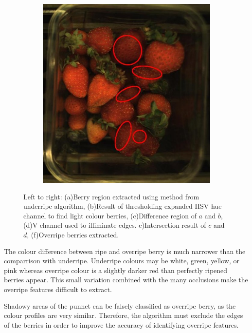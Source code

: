 \documentclass[fleqn,twoside]{article}
\begin{document}
\begin{figure}[ht]
\begin{subfigure}{.30\textwidth}
		\caption{}
		\label{fig:over_light_diff}
	\end{subfigure}%
	\begin{subfigure}{.30\textwidth}
		\centering
		\includegraphics[width=.9\linewidth]{over_result.jpg}
		\caption{}
		\label{fig:over_result}
	\end{subfigure}%
	
	\caption{Left to right: (a)Berry region extracted using method from underripe algorithm, (b)Result of thresholding expanded HSV hue channel to find light colour berries, (c)Difference region of $a$ and $b$, (d)V channel used to illiminate edges. e)Intersection result of $c$ and $d$, (f)Overripe berries extracted.}
	\label{fig:overripe_process}
\end{figure} 

The colour difference between ripe and overripe berry is much narrower than the comparrison with underripe. Underripe colours may be white, green, yellow, or pink whereas overripe colour is a slightly darker red than perfectly ripened berries appear. This small variation combined with the many occlusions make the overripe features difficult to extract.

Shadowy areas of the punnet can be falsely classified as overripe berry, as the colour profiles are very similar. Therefore, the algorithm must exclude the edges of the berries in order to improve the accuracy of identifying overripe features. 
\end{document}
